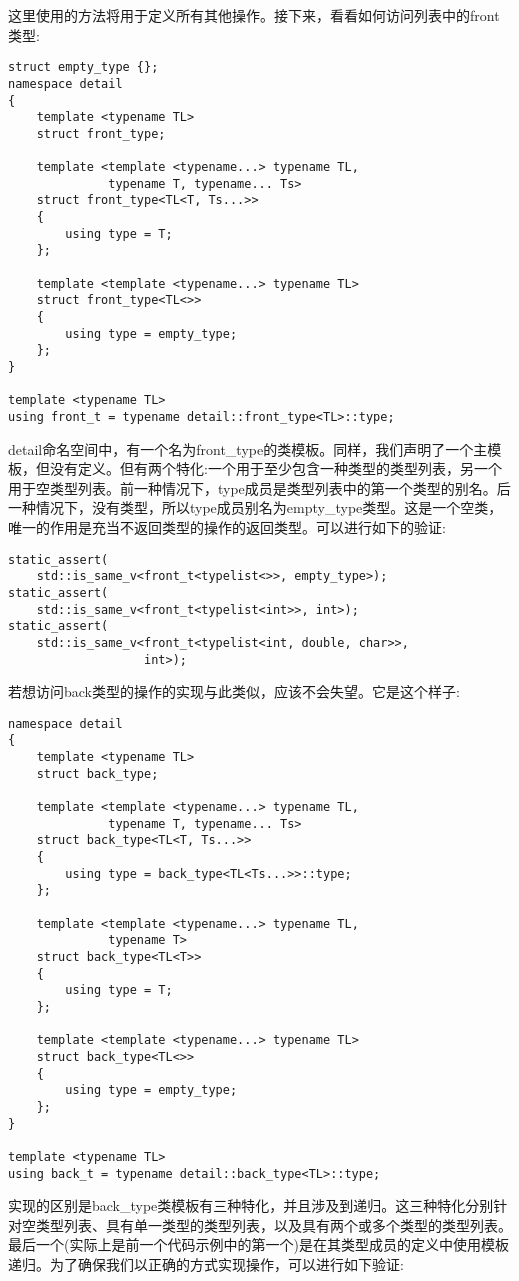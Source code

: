 这里使用的方法将用于定义所有其他操作。接下来，看看如何访问列表中的front类型:

\begin{lstlisting}[style=styleCXX]
struct empty_type {};
namespace detail
{
	template <typename TL>
	struct front_type;
	
	template <template <typename...> typename TL,
			  typename T, typename... Ts>
	struct front_type<TL<T, Ts...>>
	{
		using type = T;
	};

	template <template <typename...> typename TL>
	struct front_type<TL<>>
	{
		using type = empty_type;
	};
}

template <typename TL>
using front_t = typename detail::front_type<TL>::type;
\end{lstlisting}

detail命名空间中，有一个名为front\_type的类模板。同样，我们声明了一个主模板，但没有定义。但有两个特化:一个用于至少包含一种类型的类型列表，另一个用于空类型列表。前一种情况下，type成员是类型列表中的第一个类型的别名。后一种情况下，没有类型，所以type成员别名为empty\_type类型。这是一个空类，唯一的作用是充当不返回类型的操作的返回类型。可以进行如下的验证:

\begin{lstlisting}[style=styleCXX]
static_assert(
	std::is_same_v<front_t<typelist<>>, empty_type>);
static_assert(
	std::is_same_v<front_t<typelist<int>>, int>);
static_assert(
	std::is_same_v<front_t<typelist<int, double, char>>,
				   int>);
\end{lstlisting}

若想访问back类型的操作的实现与此类似，应该不会失望。它是这个样子:

\begin{lstlisting}[style=styleCXX]
namespace detail
{
	template <typename TL>
	struct back_type;
	
	template <template <typename...> typename TL,
			  typename T, typename... Ts>
	struct back_type<TL<T, Ts...>>
	{
		using type = back_type<TL<Ts...>>::type;
	};

	template <template <typename...> typename TL,
	          typename T>
	struct back_type<TL<T>>
	{
		using type = T;
	};

	template <template <typename...> typename TL>
	struct back_type<TL<>>
	{
		using type = empty_type;
	};
}

template <typename TL>
using back_t = typename detail::back_type<TL>::type;
\end{lstlisting}

实现的区别是back\_type类模板有三种特化，并且涉及到递归。这三种特化分别针对空类型列表、具有单一类型的类型列表，以及具有两个或多个类型的类型列表。最后一个(实际上是前一个代码示例中的第一个)是在其类型成员的定义中使用模板递归。为了确保我们以正确的方式实现操作，可以进行如下验证:

